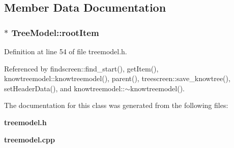 \subsection{Member Data Documentation}
\subsubsection{$\ast$ {\bf Tree\-Model::root\-Item}}\label{classTreeModel_8921084214c2ff8a56b15e201f02ed89}




Definition at line 54 of file treemodel.h.

Referenced by findscreen::find\_\-start(), get\-Item(), knowtreemodel::knowtreemodel(), parent(), treescreen::save\_\-knowtree(), set\-Header\-Data(), and knowtreemodel::$\sim$knowtreemodel().

The documentation for this class was generated from the following files:\begin{CompactItemize}
\item 
{\bf treemodel.h}\item 
{\bf treemodel.cpp}\end{CompactItemize}
